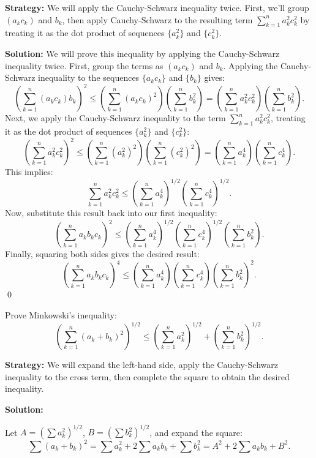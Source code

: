 \noindent\textbf{Strategy:} We will apply the Cauchy-Schwarz inequality twice. First, we'll group $(a_k c_k)$ and $b_k$, then apply Cauchy-Schwarz to the resulting term $\sum_{k=1}^n a_k^2 c_k^2$ by treating it as the dot product of sequences $\{a_k^2\}$ and $\{c_k^2\}$.

\bigskip\noindent\textbf{Solution:}
We will prove this inequality by applying the Cauchy-Schwarz inequality twice.
First, group the terms as $(a_k c_k)$ and $b_k$. Applying the Cauchy-Schwarz inequality to the sequences $\{a_k c_k\}$ and $\{b_k\}$ gives:
\[
\left( \sum_{k=1}^n (a_k c_k) b_k \right)^2 \leq \left( \sum_{k=1}^n (a_k c_k)^2 \right) \left( \sum_{k=1}^n b_k^2 \right) = \left( \sum_{k=1}^n a_k^2 c_k^2 \right) \left( \sum_{k=1}^n b_k^2 \right).
\]
Next, we apply the Cauchy-Schwarz inequality to the term $\sum_{k=1}^n a_k^2 c_k^2$, treating it as the dot product of sequences $\{a_k^2\}$ and $\{c_k^2\}$:
\[
\left( \sum_{k=1}^n a_k^2 c_k^2 \right)^2 \leq \left( \sum_{k=1}^n (a_k^2)^2 \right) \left( \sum_{k=1}^n (c_k^2)^2 \right) = \left( \sum_{k=1}^n a_k^4 \right) \left( \sum_{k=1}^n c_k^4 \right).
\]
This implies:
\[
\sum_{k=1}^n a_k^2 c_k^2 \leq \left( \sum_{k=1}^n a_k^4 \right)^{1/2} \left( \sum_{k=1}^n c_k^4 \right)^{1/2}.
\]
Now, substitute this result back into our first inequality:
\[
\left( \sum_{k=1}^n a_k b_k c_k \right)^2 \leq \left( \sum_{k=1}^n a_k^4 \right)^{1/2} \left( \sum_{k=1}^n c_k^4 \right)^{1/2} \left( \sum_{k=1}^n b_k^2 \right).
\]
Finally, squaring both sides gives the desired result:
\[
\left( \sum_{k=1}^n a_k b_k c_k \right)^4 \leq \left( \sum_{k=1}^n a_k^4 \right) \left( \sum_{k=1}^n c_k^4 \right) \left( \sum_{k=1}^n b_k^2 \right)^2.
\]\qed


\begin{problembox}
Prove Minkowski's inequality:
\[
\left( \sum_{k=1}^n (a_k + b_k)^2 \right)^{1/2} \leq \left( \sum_{k=1}^n a_k^2 \right)^{1/2} + \left( \sum_{k=1}^n b_k^2 \right)^{1/2}.
\]
\end{problembox}

\noindent\textbf{Strategy:} We will expand the left-hand side, apply the Cauchy-Schwarz inequality to the cross term, then complete the square to obtain the desired inequality.

\bigskip\noindent\textbf{Solution:}

Let \( A = \left( \sum a_k^2 \right)^{1/2} \), \( B = \left( \sum b_k^2 \right)^{1/2} \), and expand the square:
\[
\sum (a_k + b_k)^2 = \sum a_k^2 + 2\sum a_k b_k + \sum b_k^2 = A^2 + 2\sum a_k b_k + B^2.
\]

